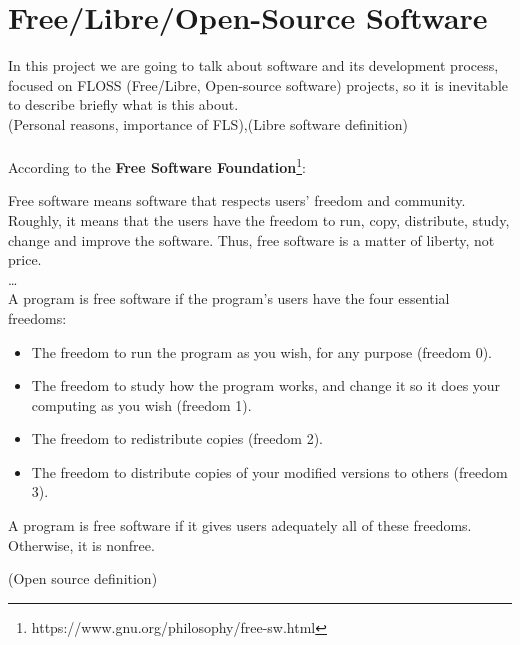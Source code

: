 \documentclass[a4paper, 12pt]{book}
\begin{document}
\section{Free/Libre/Open-Source Software}
\label{sec:floss-definition}
In this project we are going to talk about software and its development process, focused on FLOSS (Free/Libre, Open-source
software) projects, so it is inevitable to describe briefly what is this about.\\
(Personal reasons, importance of FLS),(Libre software definition)\\\\
According to the \textbf{Free Software Foundation}\footnote{https://www.gnu.org/philosophy/free-sw.html}:
\begin{displayquote}
    Free software means software that respects users' freedom and community. Roughly, it means that the users have the freedom
    to run, copy, distribute, study, change and improve the software. Thus, free software is a matter of liberty, not price.\\
    \ldots\\
    A program is free software if the program's users have the four essential freedoms:
       \begin{itemize}
           \item The freedom to run the program as you wish, for any purpose (freedom 0).
           \item The freedom to study how the program works, and change it so it does your computing as you wish (freedom 1).
           \item The freedom to redistribute copies (freedom 2).
           \item The freedom to distribute copies of your modified versions to others (freedom 3).
       \end{itemize}
    A program is free software if it gives users adequately all of these freedoms. Otherwise, it is nonfree.
\end{displayquote}
(Open source definition)

\end{document}
